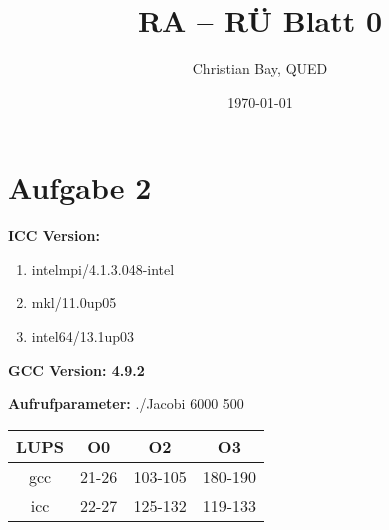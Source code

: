 \documentclass{article}
\title{RA -- R\"U Blatt 0}
\author{Christian Bay, QUED}
\date{\today}
\begin{document}
\maketitle
\section*{Aufgabe 2}

\textbf{ICC Version:}
\begin{enumerate}
	\item intelmpi/4.1.3.048-intel
	\item mkl/11.0up05
	\item intel64/13.1up03
\end{enumerate}

\textbf{GCC Version: 4.9.2}
\vspace*{6pt}

\textbf{Aufrufparameter:} ./Jacobi 6000 500
\begin{center}
	\begin{tabular}{| c || c | c | c |}
		LUPS & O0 & O2 & O3 \\
		\hline \hline
		gcc  & 21-26  & 103-105  & 180-190 \\
		\hline
		icc  & 22-27  & 125-132  & 119-133 \\
		\hline
	\end{tabular}
\end{center}
\end{document}
